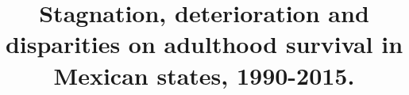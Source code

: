 \documentclass{bmcart}
\begin{document}
\begin{frontmatter}

\begin{fmbox}


\title{Stagnation, deterioration and disparities on adulthood survival in Mexican states, 1990-2015.  }


\author[
   addressref={aff1},                   %
   corref={aff1},     
   noteref={n1},                  %
   email={jmaburto@health.sdu.dk}   %
]{ }
\author[
   addressref={aff2},
   noteref={n1},
   email={riffe@demogr.mpg.de}
]{ }
\author[
   addressref={aff1},                   %
   email={vcanudas@health.sdu.dk}
]{ }


\address[id=aff1]{%
  , %
  ,                     %
  ,                              %
}
\address[id=aff2]{%
  ,
  ,
  ,
}


\end{fmbox}
\end{frontmatter}
\end{document}
